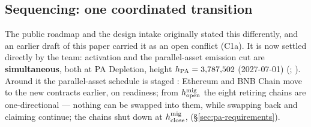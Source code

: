 \subsection{Sequencing: one coordinated transition}
\label{sec:pa-sequencing}

The public roadmap and the design intake originally stated this differently, and an earlier draft of
this paper carried it as an open conflict (C1a). It is now settled directly by the team: \PNR
activation and the parallel-asset emission cut are \textbf{simultaneous}, both at PA Depletion,
height $h_{\mathrm{PA}} = 3{,}787{,}502$ (2027-07-01) (\planned; ). Around it the
parallel-asset schedule is staged : Ethereum and BNB Chain
move to the new contracts earlier, on readiness; from $h^{\mathrm{mig}}_{\mathrm{open}}$ the eight retiring chains are
one-directional --- nothing can be swapped into them, while swapping back and claiming continue; the
chains shut down at $h^{\mathrm{mig}}_{\mathrm{close}}$,
 (\S\ref{sec:pa-requirements}).

